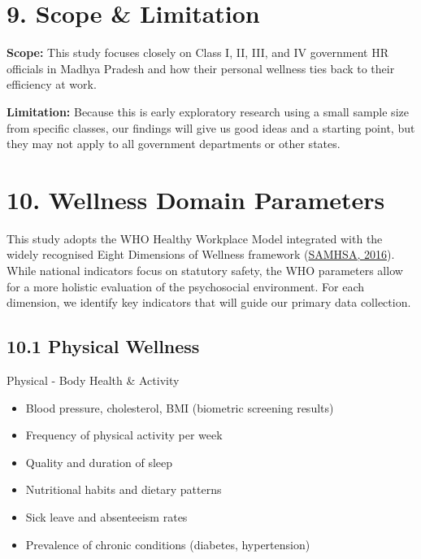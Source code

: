 \documentclass[11pt,a4paper]{article}
\begin{document}
\section{9. Scope \& Limitation}
\vspace{0.2cm}
\textbf{Scope:} This study focuses closely on Class I, II, III, and IV government HR officials in Madhya Pradesh and how their personal wellness ties back to their efficiency at work.

\textbf{Limitation:} Because this is early exploratory research using a small sample size from specific classes, our findings will give us good ideas and a starting point, but they may not apply to all government departments or other states.

\section{10. Wellness Domain Parameters}
\vspace{0.2cm}
This study adopts the WHO Healthy Workplace Model integrated with the widely recognised Eight Dimensions of Wellness framework (\href{https://store.samhsa.gov/product/creating-a-healthier-life/sma16-4958}{SAMHSA, 2016}). While national indicators focus on statutory safety, the WHO parameters allow for a more holistic evaluation of the psychosocial environment. For each dimension, we identify key indicators that will guide our primary data collection.

\subsection{10.1 Physical Wellness}
\begin{defbox}{Physical - Body Health \& Activity}
\begin{itemize}
  \item Blood pressure, cholesterol, BMI (biometric screening results)
  \item Frequency of physical activity per week
  \item Quality and duration of sleep
  \item Nutritional habits and dietary patterns
  \item Sick leave and absenteeism rates
  \item Prevalence of chronic conditions (diabetes, hypertension)
\end{itemize}
\end{defbox}
\end{document}
